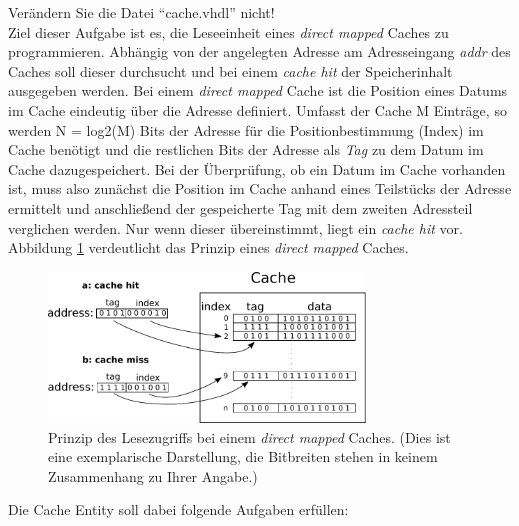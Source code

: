 \documentclass[a4paper,12pt]{article}
\begin{document}
Ver\"andern Sie die Datei "`cache.vhdl"' nicht!\\




Ziel dieser Aufgabe ist es, die Leseeinheit eines \textit{direct mapped} Caches zu programmieren. Abh\"angig von der angelegten Adresse am Adresseingang \textit{addr} des Caches soll dieser durchsucht und bei einem \textit{cache hit} der Speicherinhalt ausgegeben werden. Bei einem \textit{direct mapped} Cache ist die Position eines Datums im Cache eindeutig \"uber die Adresse definiert. Umfasst der Cache M Eintr\"age, so werden N = log2(M) Bits der Adresse f\"ur die Positionbestimmung (Index) im Cache ben\"otigt und die restlichen Bits der Adresse als \textit{Tag} zu dem Datum im Cache dazugespeichert. Bei der \"Uberpr\"ufung, ob ein Datum im Cache vorhanden ist, muss also zun\"achst die Position im Cache anhand eines Teilst\"ucks der Adresse ermittelt und anschlie{\ss}end der gespeicherte Tag mit dem zweiten Adressteil verglichen werden. Nur wenn dieser \"ubereinstimmt, liegt ein \textit{cache hit} vor. Abbildung \ref{img_cache} verdeutlicht das Prinzip eines \textit{direct mapped} Caches. \\

\begin{figure}[h]
\begin{center}
\includegraphics[width=0.75\textwidth]{../static/cache.pdf}
\caption{Prinzip des Lesezugriffs bei einem \textit{direct mapped} Caches. (Dies ist eine exemplarische Darstellung, die Bitbreiten stehen in keinem Zusammenhang zu Ihrer Angabe.)}
\label{img_cache}
\end{center}
\end{figure}

Die Cache Entity soll dabei folgende Aufgaben erf\"ullen:
\end{document}
